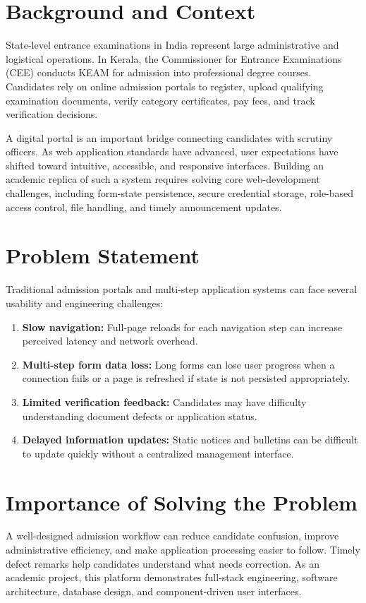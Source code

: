 \documentclass[12pt,a4paper,oneside]{report}
\begin{document}
\section{Background and Context}
State-level entrance examinations in India represent large administrative and logistical operations. In Kerala, the Commissioner for Entrance Examinations (CEE) conducts KEAM for admission into professional degree courses. Candidates rely on online admission portals to register, upload qualifying examination documents, verify category certificates, pay fees, and track verification decisions.

A digital portal is an important bridge connecting candidates with scrutiny officers. As web application standards have advanced, user expectations have shifted toward intuitive, accessible, and responsive interfaces. Building an academic replica of such a system requires solving core web-development challenges, including form-state persistence, secure credential storage, role-based access control, file handling, and timely announcement updates.

\section{Problem Statement}
Traditional admission portals and multi-step application systems can face several usability and engineering challenges:
\begin{enumerate}
    \item \textbf{Slow navigation:} Full-page reloads for each navigation step can increase perceived latency and network overhead.
    \item \textbf{Multi-step form data loss:} Long forms can lose user progress when a connection fails or a page is refreshed if state is not persisted appropriately.
    \item \textbf{Limited verification feedback:} Candidates may have difficulty understanding document defects or application status.
    \item \textbf{Delayed information updates:} Static notices and bulletins can be difficult to update quickly without a centralized management interface.
\end{enumerate}

\section{Importance of Solving the Problem}
A well-designed admission workflow can reduce candidate confusion, improve administrative efficiency, and make application processing easier to follow. Timely defect remarks help candidates understand what needs correction. As an academic project, this platform demonstrates full-stack engineering, software architecture, database design, and component-driven user interfaces.
\end{document}
